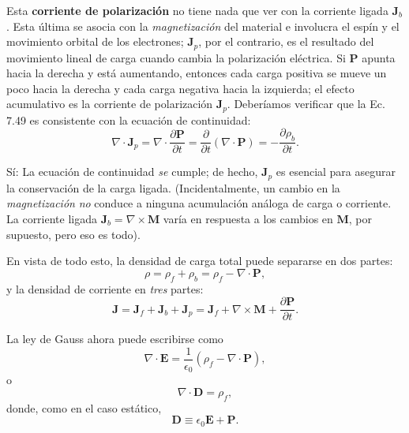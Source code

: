 \documentclass[12pt,a4paper]{report}
\newcommand{\esp}{\vspace{0.5cm}}
\begin{document}
	Esta \textbf{corriente de polarización} no tiene nada que ver con la corriente ligada $\mathbf{J}_b$. Esta última se asocia con la \textit{magnetización} del material e involucra el espín y el movimiento orbital de los electrones; $\mathbf{J}_p$, por el contrario, es el resultado del movimiento lineal de carga cuando cambia la polarización eléctrica. Si $\mathbf{P}$ apunta hacia la derecha y está aumentando, entonces cada carga positiva se mueve un poco hacia la derecha y cada carga negativa hacia la izquierda; el efecto acumulativo es la corriente de polarización $\mathbf{J}_p$. Deberíamos verificar que la Ec. 7.49 es consistente con la ecuación de continuidad:
	\begin{equation*}
		\nabla \cdot \mathbf{J}_p = \nabla \cdot \frac{\partial \mathbf{P}}{\partial t} = \frac{\partial}{\partial t} (\nabla \cdot \mathbf{P}) = -\frac{\partial \rho_b}{\partial t}.
	\end{equation*}
	
	\esp
	
	Sí: La ecuación de continuidad \textit{se} cumple; de hecho, $\mathbf{J}_p$ es esencial para asegurar la conservación de la carga ligada. (Incidentalmente, un cambio en la \textit{magnetización} \textit{no} conduce a ninguna acumulación análoga de carga o corriente. La corriente ligada $\mathbf{J}_b = \nabla \times \mathbf{M}$ varía en respuesta a los cambios en $\mathbf{M}$, por supuesto, pero eso es todo).
	
	En vista de todo esto, la densidad de carga total puede separarse en dos partes:
	\begin{equation}
		\rho = \rho_f + \rho_b = \rho_f - \nabla \cdot \mathbf{P}, \tag{7.50}
	\end{equation}
	y la densidad de corriente en \textit{tres} partes:
	\begin{equation}
		\mathbf{J} = \mathbf{J}_f + \mathbf{J}_b + \mathbf{J}_p = \mathbf{J}_f + \nabla \times \mathbf{M} + \frac{\partial \mathbf{P}}{\partial t}. \tag{7.51}
	\end{equation}
	
	La ley de Gauss ahora puede escribirse como
	\begin{equation*}
		\nabla \cdot \mathbf{E} = \frac{1}{\epsilon_0} (\rho_f - \nabla \cdot \mathbf{P}),
	\end{equation*}
	o
	\begin{equation}
		\nabla \cdot \mathbf{D} = \rho_f, \tag{7.52}
	\end{equation}
	donde, como en el caso estático,
	\begin{equation}
		\mathbf{D} \equiv \epsilon_0 \mathbf{E} + \mathbf{P}. \tag{7.53}
	\end{equation}
	
\end{document}
